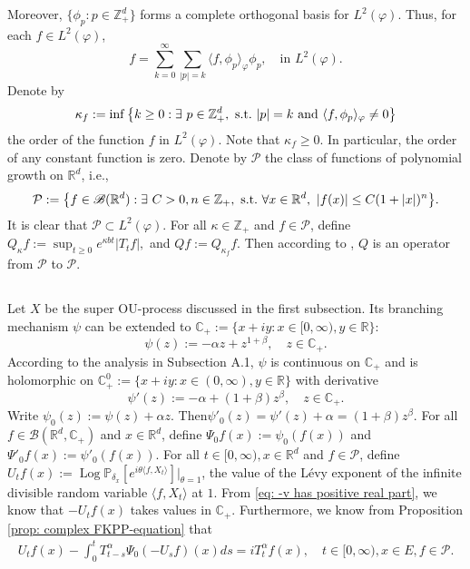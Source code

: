 \documentclass[12pt]{amsart}
\theoremstyle{plain}
\theoremstyle{definition}
\numberwithin{equation}{section}
\begin{document}
    Moreover, $\{\phi_p: p \in \mathbb Z_+^d\}$ forms a complete orthogonal basis for $L^2(\varphi)$.
    Thus, for each $f\in L^2(\varphi)$,
\begin{equation}\label{semicomp1}
    f
    =\sum_{k=0}^{\infty}\sum_{|p|=k}\langle f, \phi_p \rangle_{\varphi} \phi_p,
    \quad \text{in~} L^2(\varphi).
\end{equation}
    Denote by
\begin{equation}\label{order}
    \kappa_f
    :=\inf \left \{k\geq 0: \exists ~ p\in \mathbb Z_+^d ,{\rm ~s.t.~}|p|=k {\rm ~and~}  \langle f, \phi_p \rangle_{\varphi}\neq 0\right \}
\end{equation}
    the order of the function $f$ in $L^2(\varphi)$.
    Note that $ \kappa_f\geq 0$.
    In particular, the order of any constant function is zero.
    Denote by $\mathcal P$ the class of functions of polynomial growth on $\mathbb R^d$, i.e.,
\begin{equation}
    \mathcal{P}
    :=\big \{f\in \mathscr B(\mathbb{R}^d):\exists~ C>0, n \in \mathbb Z_+, {\rm ~s.t.~} \forall x\in \mathbb{R}^d,~ |f(x)|\leq C(1+|x|)^n\big\}.
\end{equation}
    It is clear that $\mathcal{P} \subset L^2(\varphi)$.
    For all $\kappa \in \mathbb Z_+$ and $f\in \mathcal P$, define
$
	Q_\kappa f := \sup_{t\geq 0} e^{\kappa b t}|T_t f|,
$
and
$
	Q f:= Q_{\kappa_f}f.
$
    Then according to \cite[Fact 1.2]{MM}, $Q$ is an operator from $\mathcal P$ to $\mathcal P$.
\subsection{}
    Let $X$ be the super OU-process discussed in the first subsection.
    Its branching mechanism $\psi$ can be extended to $\mathbb C_+:=\{x+iy: x\in [0, \infty), y\in \mathbb R\}$:
 $$\psi(z) := -\alpha z + z^{1+\beta}, \quad z\in \mathbb C_+.$$ 
    According to the analysis in Subsection A.1, 
    $\psi$ is continuous on $\mathbb C_+$ and is holomorphic on $\mathbb C_+^0:=
    \{x+iy: x\in (0, \infty), y\in \mathbb R\}$ with derivative
\begin{equation}
\label{eq: deriavetive of the Poission part}
    \psi'(z) := -\alpha + (1+\beta)z^{\beta},
    \quad z\in \mathbb C_+.
\end{equation}
    Write $\psi_0(z) := \psi(z) + \alpha z$. Then$\psi'_0(z) = \psi'(z) + \alpha=(1+\beta)z^{\beta}$.
    For all $f\in \mathcal B(\mathbb R^d, \mathbb C_+)$ and $x\in \mathbb R^d$, define $\Psi_0f(x) := \psi_0(f(x))$ and $\Psi'_0 f(x) := \psi'_0(f(x))$.
    For all $t\in [0,\infty), x\in \mathbb R^d $ and $f \in \mathcal{P}$, define $U_tf(x) := \operatorname{Log} \mathbb P_{\delta_x}[e^{i\theta \langle f, X_t\rangle}]|_{\theta = 1}$, the value of the L\'evy exponent of the infinite divisible random variable $\langle f, X_t\rangle$ at $1$.
    From \eqref{eq: -v has positive real part}, we know that $-U_tf(x)$ takes values in $\mathbb C_+$. Furthermore, we know from Proposition \ref{prop: complex FKPP-equation} that
\begin{align}
\label{eq:chareq2}
    U_tf(x)-\int_0^t T^{\alpha}_{t-s} \Psi_0(-U_sf)(x)ds
    =i T^{\alpha}_t f(x),
    \quad t\in [0,\infty), x\in E, f\in \mathcal P.
\end{align}
\end{document}
